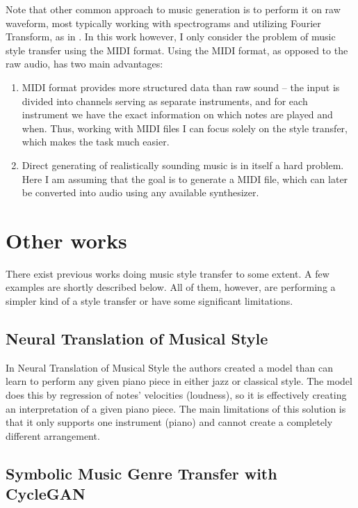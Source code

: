 \documentclass[en]{pracamgr}
\begin{document}
Note that other common approach to music generation is to perform it on raw waveform, most typically working with spectrograms and utilizing Fourier Transform, as in \cite{music_generation}.
In this work however, I only consider the problem of music style transfer using the MIDI format.
Using the MIDI format, as opposed to the raw audio, has two main advantages:

\begin{enumerate}
    \item
    MIDI format provides more structured data than raw sound -- the input is divided into channels serving as separate instruments, and for each instrument we have the exact information on which notes are played and when.
    Thus, working with MIDI files I can focus solely on the style transfer, which makes the task much easier.
    \item
    Direct generating of realistically sounding music is in itself a hard problem.
    Here I am assuming that the goal is to generate a MIDI file, which can later be converted into audio using any available synthesizer.
\end{enumerate}

\section{Other works}

There exist previous works doing music style transfer to some extent.
A few examples are shortly described below.
All of them, however, are performing a simpler kind of a style transfer or have some significant limitations.

\subsection{Neural Translation of Musical Style}

In Neural Translation of Musical Style \cite{neural_translation} the authors created a model than can learn to perform any given piano piece in either jazz or classical style.
The model does this by regression of notes' velocities (loudness), so it is effectively creating an interpretation of a given piano piece.
The main limitations of this solution is that it only supports one instrument (piano) and cannot create a completely different arrangement.

\subsection{Symbolic Music Genre Transfer with CycleGAN}
\end{document}
